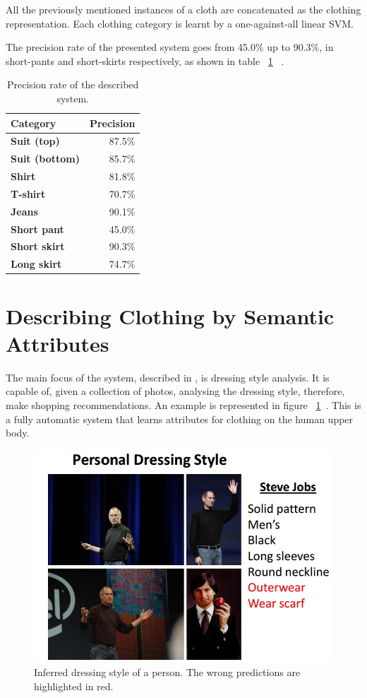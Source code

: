 \documentclass[titlepage,12pt,a4paper,times]{book}
\begin{document}
All the previously mentioned instances of a cloth are concatenated as the
clothing representation. Each clothing category is learnt by a
one-against-all linear \ac{SVM}.

The precision rate of the presented system goes from 45.0\% up to 90.3\%,
in short-pants and short-skirts respectively, as shown in table ~\ref{tab:prds}
 ~\citep{1}.

\begin{table}
\centering
\begin{tabular}{|l|r|}
\hline
\textbf{Category} & \textbf{Precision}\\
\hline
\hline
\textbf{Suit (top)} & 87.5\% \\
\hline
\textbf{Suit (bottom)} & 85.7\% \\
\hline
\textbf{Shirt} & 81.8\% \\
\hline
\textbf{T-shirt} & 70.7\% \\
\hline
\textbf{Jeans} & 90.1\% \\
\hline
\textbf{Short pant} & 45.0\% \\
\hline
\textbf{Short skirt} & 90.3\% \\
\hline
\textbf{Long skirt} & 74.7\% \\
\hline
\end{tabular}
\caption{Precision rate of the described system.}
\label{tab:prds}
\end{table}
\FloatBarrier

\section{Describing Clothing by Semantic Attributes}
\label{chap2:sec:art2}

The main focus of the system, described in \citep{2}, is dressing style
analysis. It is capable of, given a collection of photos, analysing the
dressing style, therefore, make shopping recommendations. An example is
represented in figure ~\ref{fig:ids}~\citep{2}. This is a fully automatic
system that learns attributes for clothing on the human upper body.

\begin{figure}[!h]
\centering
\includegraphics[scale=0.5]{images/2_3_fig0.jpg}
\caption{Inferred dressing style of a person. The wrong predictions are
highlighted in red.}
\label{fig:ids}
\end{figure}
\FloatBarrier
\end{document}
